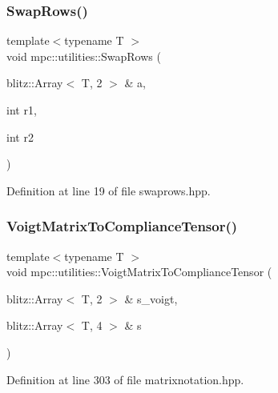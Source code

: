 \subsubsection{\texorpdfstring{Swap\+Rows()}{SwapRows()}}
{\footnotesize\ttfamily template$<$typename T $>$ \\
void mpc\+::utilities\+::\+Swap\+Rows (\begin{DoxyParamCaption}\item[{blitz\+::\+Array$<$ T, 2 $>$ \&}]{a,  }\item[{int}]{r1,  }\item[{int}]{r2 }\end{DoxyParamCaption})}



Definition at line 19 of file swaprows.\+hpp.

\mbox{\label{namespacempc_1_1utilities_a14f790d9a892452ed500ba8d7caf0222}} 
\subsubsection{\texorpdfstring{Voigt\+Matrix\+To\+Compliance\+Tensor()}{VoigtMatrixToComplianceTensor()}}
{\footnotesize\ttfamily template$<$typename T $>$ \\
void mpc\+::utilities\+::\+Voigt\+Matrix\+To\+Compliance\+Tensor (\begin{DoxyParamCaption}\item[{blitz\+::\+Array$<$ T, 2 $>$ \&}]{s\+\_\+voigt,  }\item[{blitz\+::\+Array$<$ T, 4 $>$ \&}]{s }\end{DoxyParamCaption})}



Definition at line 303 of file matrixnotation.\+hpp.

\mbox{\label{namespacempc_1_1utilities_af0464cc342675cdd798936b674ceb8a9}} 
